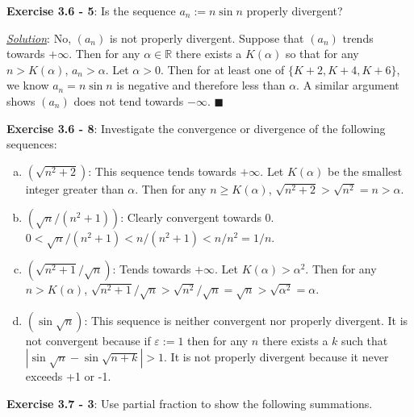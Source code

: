 \documentclass{article}
\begin{document}
\hrulefill

\textbf{Exercise 3.6 - 5}: Is the sequence $a_n := n \sin n$ properly
divergent?

\underline{\textit{Solution}}: No, $(a_n)$ is not properly divergent.
Suppose that $(a_n)$ trends towards $+\infty$. Then for any
$\alpha \in \mathbb{R}$ there exists a $K(\alpha)$ so that for any
$n > K(\alpha)$, $a_n > \alpha$. Let $\alpha > 0$. Then for at least
one of $\{K+2, K+4, K+6\}$, we know $a_n = n \sin n$ is negative and
therefore less than $\alpha$. A similar argument shows $(a_n)$ does not tend
towards $-\infty$. \hfill $\blacksquare$

\hrulefill

\textbf{Exercise 3.6 - 8}:
Investigate the convergence or divergence of the following sequences:
\begin{enumerate}[(a)]
  \item $(\sqrt{n^2+2})$: This sequence tends towards $+\infty$. Let
    $K(\alpha)$ be the smallest integer greater than $\alpha$. Then for
    any $n \geq K(\alpha)$, $\sqrt{n^2+2} > \sqrt{n^2} = n > \alpha$.
  \item $(\sqrt{n}/(n^2+1))$: Clearly convergent towards 0.
    $0 < \sqrt{n}/(n^2+1) < n/(n^2+1) < n/n^2 = 1/n$.
  \item $(\sqrt{n^2+1}/\sqrt{n})$: Tends towards $+\infty$. Let
    $K(\alpha) > \alpha^2$. Then for any $n > K(\alpha)$,
    $\sqrt{n^2+1}/\sqrt{n} > \sqrt{n^2}/\sqrt{n}
    = \sqrt{n} > \sqrt{\alpha^2} = \alpha$.
  \item $(\sin \sqrt{n})$: This sequence is neither convergent nor
    properly divergent. It is not convergent because if $\varepsilon := 1$
    then for any $n$ there exists a $k$ such that
    $|\sin \sqrt n - \sin \sqrt{n+k}| > 1$. It is not properly divergent
    because it never exceeds +1 or -1.
\end{enumerate}

\hrulefill

\textbf{Exercise 3.7 - 3}: Use partial fraction to show the following
summations.
\end{document}
